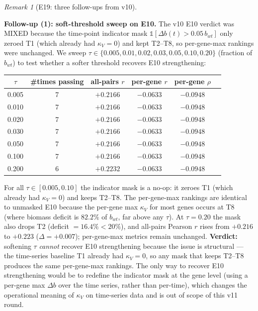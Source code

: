 \documentclass[11pt,a4paper]{article}
\theoremstyle{plain}
\theoremstyle{definition}
\theoremstyle{remark}
\newtheorem{remark}[theorem]{Remark}
\begin{document}
\begin{remark}[E19: three follow-ups from v10]
\label{rem:e19-three-follow-ups}

\textbf{Follow-up (1): soft-threshold sweep on E10.} The v10 E10
verdict was MIXED because the time-point indicator mask
$\mathbb{1}[\Delta b(t) > 0.05\,b_{wt}]$ only zeroed T1 (which already
had $\kappa_V = 0$) and kept T2--T8, so per-gene-max rankings were
unchanged. We sweep $\tau \in \{0.005, 0.01, 0.02, 0.03, 0.05, 0.10,
0.20\}$ (fraction of $b_{wt}$) to test whether a softer threshold
recovers E10 strengthening:

\begin{center}
\begin{tabular}{cccccc}
\toprule
$\tau$ & \#times passing & all-pairs $r$ & per-gene $r$ & per-gene $\rho$ \\
\midrule
0.005 & 7 & $+0.2166$ & $-0.0633$ & $-0.0948$ \\
0.010 & 7 & $+0.2166$ & $-0.0633$ & $-0.0948$ \\
0.020 & 7 & $+0.2166$ & $-0.0633$ & $-0.0948$ \\
0.030 & 7 & $+0.2166$ & $-0.0633$ & $-0.0948$ \\
0.050 & 7 & $+0.2166$ & $-0.0633$ & $-0.0948$ \\
0.100 & 7 & $+0.2166$ & $-0.0633$ & $-0.0948$ \\
0.200 & 6 & $+0.2232$ & $-0.0633$ & $-0.0948$ \\
\bottomrule
\end{tabular}
\end{center}

For all $\tau \in [0.005, 0.10]$ the indicator mask is a no-op:
it zeroes T1 (which already had $\kappa_V = 0$) and keeps T2--T8.
The per-gene-max rankings are identical to unmasked E10 because the
per-gene max $\kappa_V$ for most genes occurs at T8 (where biomass
deficit is $82.2\%$ of $b_{wt}$, far above any $\tau$). At $\tau = 0.20$
the mask also drops T2 (deficit $= 16.4\% < 20\%$), and all-pairs
Pearson $r$ rises from $+0.216$ to $+0.223$ ($\Delta = +0.007$);
per-gene-max metrics remain unchanged. \textbf{Verdict:} softening
$\tau$ \emph{cannot} recover E10 strengthening because the issue is
structural — the time-series baseline T1 already had $\kappa_V = 0$,
so any mask that keeps T2--T8 produces the same per-gene-max rankings.
The only way to recover E10 strengthening would be to redefine the
indicator mask at the gene level (using a per-gene max $\Delta b$ over
the time series, rather than per-time), which changes the operational
meaning of $\kappa_V$ on time-series data and is out of scope of this
v11 round.


\end{remark}
\end{document}
